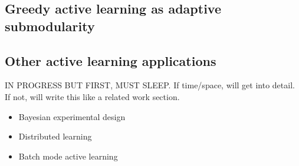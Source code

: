 \subsection{Greedy active learning as adaptive submodularity}


\subsection{Other active learning applications}
IN PROGRESS BUT FIRST, MUST SLEEP. If time/space, will get into detail. If not, will write this like a related work section.

\begin{itemize}
\item Bayesian experimental design
\item Distributed learning
\item Batch mode active learning
\end{itemize}

%
%
%
%
%
